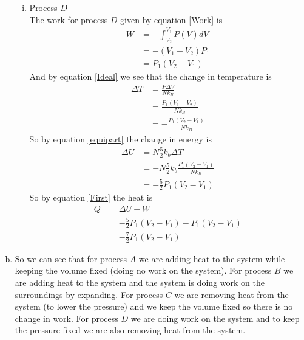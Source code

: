 \documentclass[11pt]{article}
\numberwithin{equation}{section}
\begin{document}
\begin{enumerate}[(a)]
\begin{enumerate}[(i)]
\item Process $D$ \\
The work for process $D$ given by equation \ref{Work} is
\begin{align*}
W &= -\int_{V_2}^{V_1}P(V)dV\\
&= -(V_1-V_2)P_1\\
&= P_1(V_2-V_1)
\end{align*}
And by equation \ref{Ideal} we see that the change in temperature is
\begin{align*}
\Delta T &= \frac{P\Delta V}{Nk_B}\\
&= \frac{P_1(V_1-V_2)}{Nk_B}\\
&= -\frac{P_1(V_2-V_1)}{Nk_B}
\end{align*}
So by equation \ref{equipart} the change in energy is
\begin{align*}
\Delta U &= N\frac{5}{2}k_b\Delta T\\
&= -N\frac{5}{2}k_b\frac{P_1(V_2-V_1)}{Nk_B}\\
&= -\frac{5}{2}P_1(V_2-V_1)
\end{align*}
So by equation \ref{First} the heat is
\begin{align*}
Q &= \Delta U - W\\
&= -\frac{5}{2}P_1(V_2-V_1) - P_1(V_2-V_1)\\
&= -\frac{7}{2}P_1(V_2-V_1)
\end{align*}
\end{enumerate}

\item
So we can see that for process $A$ we are adding heat to the system while keeping the volume fixed (doing no work on the system). For process $B$ we are adding heat to the system and the system is doing work on the surroundings by expanding. For process $C$ we are removing heat from the system (to lower the pressure) and we keep the volume fixed so there is no change in work. For process $D$ we are doing work on the system and to keep the pressure fixed we are also removing heat from the system.


\end{enumerate}
\end{document}
